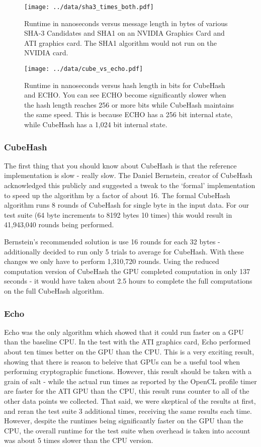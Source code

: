 \begin{figure}[p]
\texttt{[image: ../data/sha3\_times\_both.pdf]}
\caption{Runtime in nanoseconds versus message length in bytes of various SHA-3 Candidates and SHA1 on an NVIDIA Graphics Card and ATI graphics card. The SHA1 algorithm would not run on the NVIDIA card.}\label{fig:sha3_times_both}
\end{figure}

\begin{figure}[p]
\texttt{[image: ../data/cube\_vs\_echo.pdf]}
\caption{Runtime in nanoseconds versus hash length in bits for CubeHash and ECHO.  You can see ECHO become significantly slower when the hash length reaches 256 or more bits while CubeHash maintains the same speed.  This is because ECHO has a 256 bit internal state, while CubeHash has a 1,024 bit internal state.}\label{fig:cube_vs_echo}
\end{figure}

\subsubsection*{CubeHash}
The first thing that you should know about CubeHash is that the reference implementation is  slow - really slow.
The Daniel Bernstein, creator of CubeHash acknowledged this publicly\cite{Bernstein} and suggested a tweak to the `formal' implementation to speed up the algorithm by a factor of about 16.
The formal CubeHash algorithm runs 8 rounds of CubeHash for single byte in the input data. For our test suite (64 byte increments to 8192 bytes 10 times) this would result in 41,943,040 rounds being performed.

Bernstein's recommended solution is use 16 rounds for each 32 bytes - additionally decided to run only 5 trials to average for CubeHash.
With these changes we only have to perform 1,310,720 rounds.
Using the reduced computation version of CubeHash the GPU completed computation in only 137 seconds - it would have taken about 2.5 hours to complete the full computations on the full CubeHash algorithm.

\subsubsection*{Echo}
Echo was the only algorithm which showed that it could run faster on a GPU than the baseline CPU.  In the test with the ATI graphics card, Echo performed about ten times better on the GPU than the CPU.
This is a very exciting result, showing that there is reason to beleive that GPUs can be a useful tool when performing cryptographic functions.
However, this result should be taken with a grain of salt - while the actual run times as reported by the OpenCL profile timer are faster for the ATI GPU than the CPU, this result runs counter to all of the other data points we collected.
That said, we were skeptical of the results at first, and reran the test suite 3 additional times, receiving the same results each time.
However, despite the runtimes being significantly faster on the GPU than the CPU, the overall runtime for the test suite when overhead is taken into account was about 5 times slower than the CPU version.

